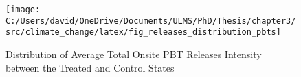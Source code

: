\begin{figure}[H]
    \centering
    \texttt{[image: C:/Users/david/OneDrive/Documents/ULMS/PhD/Thesis/chapter3/src/climate\_change/latex/fig\_releases\_distribution\_pbts]}
    \caption{Distribution of Average Total Onsite PBT Releases Intensity between the Treated and Control States}
    \label{fig:releases-distribution-pbts}
\end{figure}